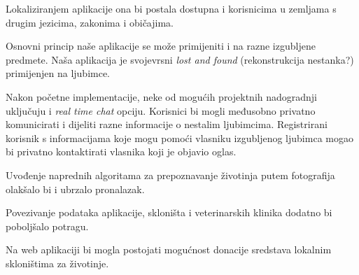 		\begin{packed_item}
		
			\item Lokaliziranjem aplikacije ona bi postala dostupna i korisnicima u zemljama s drugim jezicima, zakonima i običajima.
			
			\item Osnovni princip naše aplikacije se može primijeniti i na razne izgubljene predmete. Naša aplikacija je svojevrsni \textit{lost and found} (rekonstrukcija nestanka?) primijenjen na ljubimce.
			
			\item Nakon početne implementacije, neke od mogućih projektnih nadogradnji uključuju i \textit{real time chat} opciju. Korisnici bi mogli međusobno privatno komunicirati i dijeliti razne informacije o nestalim ljubimcima. Registrirani korisnik s informacijama koje mogu pomoći vlasniku izgubljenog ljubimca mogao bi privatno kontaktirati vlasnika koji je objavio oglas.
			
			\item Uvođenje naprednih algoritama za prepoznavanje životinja putem fotografija olakšalo bi i ubrzalo pronalazak.
			
			\item Povezivanje podataka aplikacije, skloništa i veterinarskih klinika dodatno bi poboljšalo potragu.
			
			\item Na web aplikaciji bi mogla postojati mogućnost donacije sredstava lokalnim skloništima za životinje.
			
		\end{packed_item}
		
		\eject